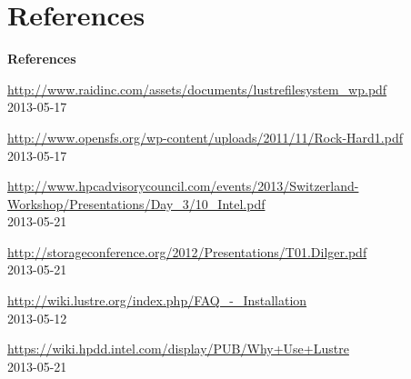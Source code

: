\documentclass[compress,t,xcolor=dvipsnames]{beamer}
\begin{document}
\section{References}
\begin{frame}{\textbf{References}}
    \scriptsize
    \begin{thebibliography}{1}
        \beamertemplatetextbibitems

            \url{http://www.raidinc.com/assets/documents/lustrefilesystem_wp.pdf}\\
            2013-05-17

            \url{http://www.opensfs.org/wp-content/uploads/2011/11/Rock-Hard1.pdf}\\
            2013-05-17

            \url{http://www.hpcadvisorycouncil.com/events/2013/Switzerland-Workshop/Presentations/Day_3/10_Intel.pdf}\\
            2013-05-21

            \url{http://storageconference.org/2012/Presentations/T01.Dilger.pdf}\\
            2013-05-21

            \url{http://wiki.lustre.org/index.php/FAQ_-_Installation}\\
            2013-05-12

            \url{https://wiki.hpdd.intel.com/display/PUB/Why+Use+Lustre}\\
            2013-05-21

    \end{thebibliography}
\end{frame}

\end{document}
